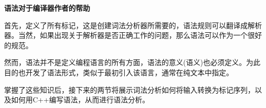 \hspace*{\fill} \par %
\textbf{语法对于编译器作者的帮助}

首先，定义了所有标记，这是创建词法分析器所需要的，语法规则可以翻译成解析器。当然，如果出现关于解析器是否正确工作的问题，那么语法可以作为一个很好的规范。\par

然而，语法并不是定义编程语言的所有方面，语法的意义(语义)也必须定义。为此目的也开发了语法形式，类似于最初引入该语言，通常在纯文本中指定。\par

掌握了这些知识后，接下来的两节将展示词法分析如何将输入转换为标记序列，以及如何用C++编写语法，从而进行语法分析。\par

























